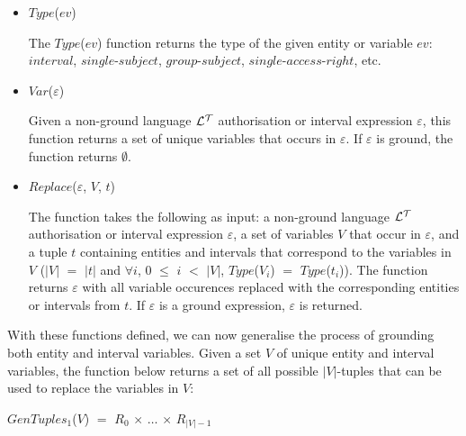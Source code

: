 \documentclass[11pt]{report}
\newenvironment{vquote}
{
  \begin{list}{}{\leftmargin 1em}\item[]
}
{
  \end{list}
}
\begin{document}
            \begin{itemize}
              \item
                $Type$($ev$)

                The $Type$($ev$) function returns the type of the given
                entity or variable $ev$: $interval$, $single$-$subject$,
                $group$-$subject$, $single$-$access$-$right$, etc.

              \item
                $Var$($\varepsilon$)

                Given a non-ground language ${\cal L^T}$ authorisation or
                interval expression $\varepsilon$, this function returns
                a set of unique variables that occurs in $\varepsilon$. If
                $\varepsilon$ is ground, the function returns $\emptyset$.

              \item
                $Replace$($\varepsilon$, $V$, $t$)

                The function takes the following as input: a non-ground
                language ${\cal L^T}$ authorisation or interval expression
                $\varepsilon$, a set of variables $V$ that occur in
                $\varepsilon$, and a tuple $t$ containing entities and
                intervals that correspond to the variables in $V$ ($|V|$ $=$
                $|t|$ and $\forall$$i$, $0$ $\leq$ $i$ $<$ $|V|$,
                $Type$($V_i$) $=$ $Type$($t_i$)). The function returns
                $\varepsilon$ with all variable occurences replaced with the
                corresponding entities or intervals from $t$. If
                $\varepsilon$ is a ground expression, $\varepsilon$ is
                returned.
            \end{itemize}

            With these functions defined, we can now generalise the process
            of grounding both entity and interval variables. Given a set $V$
            of unique entity and interval variables, the function below
            returns a set of all possible $|V|$-tuples that can be used to
            replace the variables in $V$:

            \begin{vquote}
              $GenTuples_1$($V$) $=$
              $R_0$ $\times$ $\ldots$ $\times$ $R_{|V|-1}$
            \end{vquote}
\end{document}
